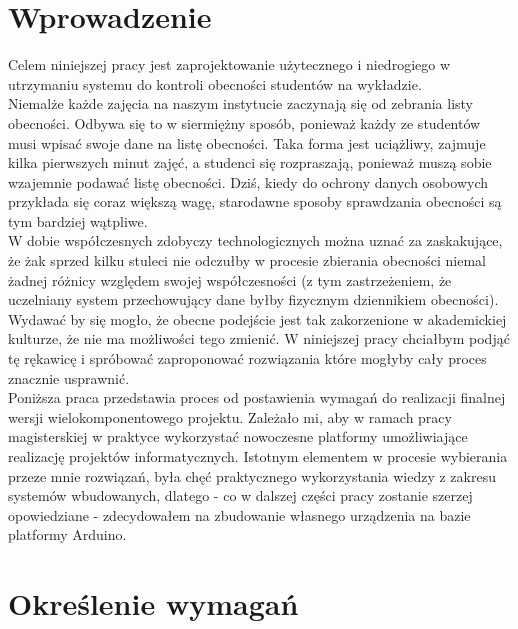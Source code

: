 \documentclass[declaration,shortabstract, mgr]{iithesis}
\author {Dawid Szczyrk}
\begin{document}
\chapter{Wprowadzenie}

Celem niniejszej pracy jest zaprojektowanie użytecznego i niedrogiego w utrzymaniu systemu do kontroli obecności studentów na wykładzie.\\
\indent Niemalże każde zajęcia na naszym instytucie zaczynają się od zebrania listy obecności. Odbywa się to w siermiężny sposób, ponieważ każdy ze studentów musi wpisać swoje dane na listę obecności.
Taka forma jest uciążliwy, zajmuje kilka pierwszych minut zajęć, a studenci się rozpraszają, ponieważ muszą sobie wzajemnie podawać listę obecności. Dziś, kiedy do ochrony danych osobowych przykłada się
coraz większą wagę, starodawne sposoby sprawdzania obecności są tym bardziej wątpliwe.\\
\indent W dobie współczesnych zdobyczy technologicznych można uznać za zaskakujące, że żak sprzed kilku stuleci nie odczułby w procesie zbierania obecności niemal żadnej różnicy względem swojej współczesności (z tym zastrzeżeniem, że uczelniany system przechowujący dane byłby fizycznym dziennikiem obecności). Wydawać by się mogło, że obecne podejście jest tak zakorzenione w akademickiej kulturze, że nie ma możliwości tego zmienić. W niniejszej pracy chciałbym podjąć tę rękawicę i spróbować zaproponować rozwiązania które mogłyby cały proces znacznie usprawnić. \\
\indent Poniższa praca przedstawia proces od postawienia wymagań do realizacji finalnej wersji wielokomponentowego projektu. Zależało mi, aby w ramach pracy magisterskiej w praktyce wykorzystać nowoczesne platformy umożliwiające realizację projektów informatycznych.
\indent Istotnym elementem w procesie wybierania przeze mnie rozwiązań, była chęć praktycznego wykorzystania wiedzy z zakresu systemów wbudowanych, dlatego - co w dalszej części pracy zostanie szerzej opowiedziane - zdecydowałem na zbudowanie własnego urządzenia na bazie platformy Arduino.


\chapter{Określenie wymagań}
\end{document}
